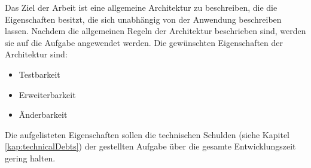 Das Ziel der Arbeit ist eine allgemeine Architektur zu beschreiben, 
die die Eigenschaften besitzt, die sich unabhängig von der Anwendung beschreiben lassen. 
Nachdem die allgemeinen Regeln der Architektur beschrieben sind, werden sie auf die Aufgabe angewendet werden.
Die gewünschten Eigenschaften der Architektur sind:
\begin{itemize}
    \item Testbarkeit
    \item Erweiterbarkeit
    \item Änderbarkeit
\end{itemize}

Die aufgelisteten Eigenschaften sollen die technischen Schulden (siehe Kapitel \ref{kap:technicalDebts}) der gestellten Aufgabe 
über die gesamte Entwicklungszeit gering halten. 
